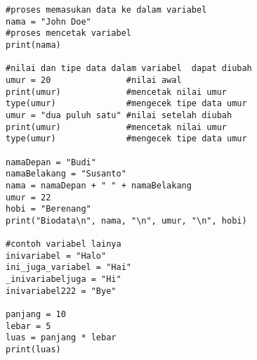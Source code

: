 \begin{verbatim}
#proses memasukan data ke dalam variabel
nama = "John Doe"
#proses mencetak variabel
print(nama)

#nilai dan tipe data dalam variabel  dapat diubah
umur = 20               #nilai awal
print(umur)             #mencetak nilai umur
type(umur)              #mengecek tipe data umur
umur = "dua puluh satu" #nilai setelah diubah
print(umur)             #mencetak nilai umur
type(umur)              #mengecek tipe data umur

namaDepan = "Budi"
namaBelakang = "Susanto"
nama = namaDepan + " " + namaBelakang
umur = 22
hobi = "Berenang"
print("Biodata\n", nama, "\n", umur, "\n", hobi)

#contoh variabel lainya
inivariabel = "Halo"
ini_juga_variabel = "Hai"
_inivariabeljuga = "Hi"
inivariabel222 = "Bye" 

panjang = 10
lebar = 5
luas = panjang * lebar
print(luas)
\end{verbatim}
